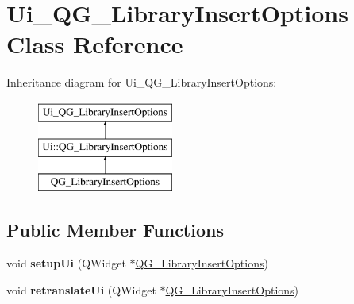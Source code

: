 \hypertarget{classUi__QG__LibraryInsertOptions}{\section{Ui\-\_\-\-Q\-G\-\_\-\-Library\-Insert\-Options Class Reference}
\label{classUi__QG__LibraryInsertOptions}
}
Inheritance diagram for Ui\-\_\-\-Q\-G\-\_\-\-Library\-Insert\-Options\-:\begin{figure}[H]
\begin{center}
\leavevmode
\includegraphics[height=3.000000cm]{classUi__QG__LibraryInsertOptions}
\end{center}
\end{figure}
\subsection*{Public Member Functions}
\begin{DoxyCompactItemize}
\item 
\hypertarget{classUi__QG__LibraryInsertOptions_a97f38c3b5482bec3fd6d6a4ce0cabec0}{void {\bfseries setup\-Ui} (Q\-Widget $\ast$\hyperlink{classQG__LibraryInsertOptions}{Q\-G\-\_\-\-Library\-Insert\-Options})}\label{classUi__QG__LibraryInsertOptions_a97f38c3b5482bec3fd6d6a4ce0cabec0}

\item 
\hypertarget{classUi__QG__LibraryInsertOptions_afb1e2bf3b3442cfea6e572c358591bb5}{void {\bfseries retranslate\-Ui} (Q\-Widget $\ast$\hyperlink{classQG__LibraryInsertOptions}{Q\-G\-\_\-\-Library\-Insert\-Options})}\label{classUi__QG__LibraryInsertOptions_afb1e2bf3b3442cfea6e572c358591bb5}

\end{DoxyCompactItemize}
